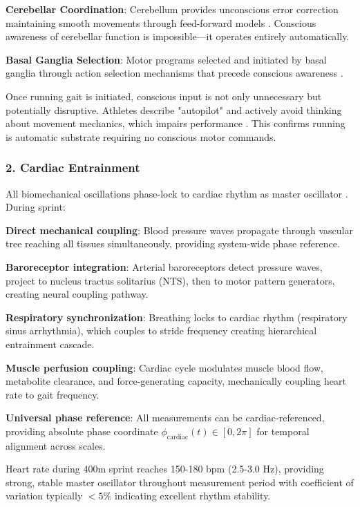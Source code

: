 \documentclass[11pt,onecolumn]{article}
\begin{document}
\textbf{Cerebellar Coordination}: Cerebellum provides unconscious error correction maintaining smooth movements through feed-forward models \citep{wolpert2011computational}. Conscious awareness of cerebellar function is impossible---it operates entirely automatically.

\textbf{Basal Ganglia Selection}: Motor programs selected and initiated by basal ganglia through action selection mechanisms that precede conscious awareness \citep{cisek2010neural}.

Once running gait is initiated, conscious input is not only unnecessary but potentially disruptive. Athletes describe "autopilot" and actively avoid thinking about movement mechanics, which impairs performance \citep{beilock2002behavioral}. This confirms running is automatic substrate requiring no conscious motor commands.

\subsubsection{2. Cardiac Entrainment}

All biomechanical oscillations phase-lock to cardiac rhythm as master oscillator \citep{sachikonye2024cardiac}. During sprint:

\textbf{Direct mechanical coupling}: Blood pressure waves propagate through vascular tree reaching all tissues simultaneously, providing system-wide phase reference.

\textbf{Baroreceptor integration}: Arterial baroreceptors detect pressure waves, project to nucleus tractus solitarius (NTS), then to motor pattern generators, creating neural coupling pathway.

\textbf{Respiratory synchronization}: Breathing locks to cardiac rhythm (respiratory sinus arrhythmia), which couples to stride frequency creating hierarchical entrainment cascade.

\textbf{Muscle perfusion coupling}: Cardiac cycle modulates muscle blood flow, metabolite clearance, and force-generating capacity, mechanically coupling heart rate to gait frequency.

\textbf{Universal phase reference}: All measurements can be cardiac-referenced, providing absolute phase coordinate $\phi_{\text{cardiac}}(t) \in [0, 2\pi]$ for temporal alignment across scales.

Heart rate during 400m sprint reaches 150-180 bpm (2.5-3.0 Hz), providing strong, stable master oscillator throughout measurement period with coefficient of variation typically $< 5\%$ indicating excellent rhythm stability.
\end{document}
